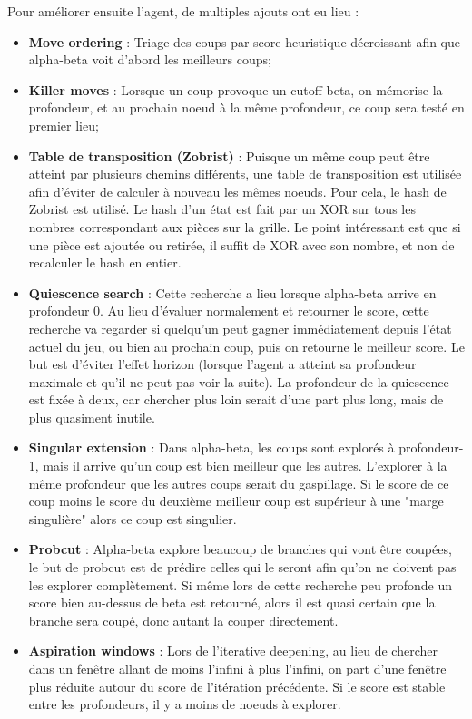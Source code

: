 \documentclass[a4paper,11pt]{article}
\begin{document}
Pour améliorer ensuite l'agent, de multiples ajouts ont eu lieu :
\begin{itemize}[nosep]
	\item \textbf{Move ordering} : Triage des coups par score heuristique décroissant afin que alpha-beta voit d'abord les meilleurs coups;
	\item \textbf{Killer moves} : Lorsque un coup provoque un cutoff beta, on mémorise la profondeur, et au prochain noeud à la même profondeur, ce coup sera testé en premier lieu; \citep{cpw_killer_moves}
	\item \textbf{Table de transposition (Zobrist)} : Puisque un même coup peut être atteint par plusieurs chemins différents, une table de transposition est utilisée afin d'éviter de calculer à nouveau les mêmes noeuds. Pour cela, le hash de Zobrist \citep{cpw_zobrist} est utilisé. Le hash d'un état est fait par un XOR sur tous les nombres correspondant aux pièces sur la grille. Le point intéressant est que si une pièce est ajoutée ou retirée, il suffit de XOR avec son nombre, et non de recalculer le hash en entier.
	\item \textbf{Quiescence search} : Cette recherche a lieu lorsque alpha-beta arrive en profondeur 0. Au lieu d'évaluer normalement et retourner le score, cette recherche va regarder si quelqu'un peut gagner immédiatement depuis l'état actuel du jeu, ou bien au prochain coup, puis on retourne le meilleur score. Le but est d'éviter l'effet horizon (lorsque l'agent a atteint sa profondeur maximale et qu'il ne peut pas voir la suite). La profondeur de la quiescence est fixée à deux, car chercher plus loin serait d'une part plus long, mais de plus quasiment inutile.
	\item \textbf{Singular extension} : Dans alpha-beta, les coups sont explorés à profondeur-1, mais il arrive qu'un coup est bien meilleur que les autres. L'explorer à la même profondeur que les autres coups serait du gaspillage. Si le score de ce coup moins le score du deuxième meilleur coup est supérieur à une "marge singulière" alors ce coup est singulier. \citep{cpw_singular}
	\item \textbf{Probcut} : Alpha-beta explore beaucoup de branches qui vont être coupées, le but de probcut est de prédire celles qui le seront afin qu'on ne doivent pas les explorer complètement. Si même lors de cette recherche peu profonde un score bien au-dessus de beta est retourné, alors il est quasi certain que la branche sera coupé, donc autant la couper directement.
	\item \textbf{Aspiration windows} : Lors de l'iterative deepening, au lieu de chercher dans un fenêtre allant de moins l'infini à plus l'infini, on part d'une fenêtre plus réduite autour du score de l'itération précédente. Si le score est stable entre les profondeurs, il y a moins de noeuds à explorer. \citep{cpw_aspiration}
\end{itemize}
\end{document}
